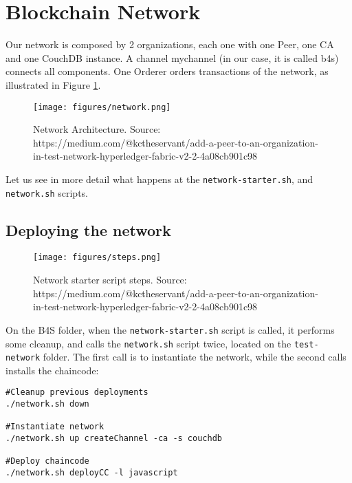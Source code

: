 \documentclass[12pt,a4paper]{article}
\theoremstyle{definition}
\begin{document}


\section{Blockchain Network}

Our network is composed by 2 organizations, each one with one Peer, one CA and one CouchDB instance. A channel mychannel (in our case, it is called b4s) connects all components. One Orderer orders transactions of the network, as illustrated in Figure \ref{fig:architecture}.


\begin{figure}[h]
    \centering
    \texttt{[image: figures/network.png]}
    \caption{Network Architecture. Source: https://medium.com/@kctheservant/add-a-peer-to-an-organization-in-test-network-hyperledger-fabric-v2-2-4a08cb901c98}
    \label{fig:architecture}
\end{figure}

Let us see in more detail what happens at the \texttt{network-starter.sh}, and \texttt{network.sh} scripts.

\subsection{Deploying the network}

\begin{figure}[h]
    \centering
    \texttt{[image: figures/steps.png]}
    \caption{Network starter script steps. Source: https://medium.com/@kctheservant/add-a-peer-to-an-organization-in-test-network-hyperledger-fabric-v2-2-4a08cb901c98}
    \label{fig:steps}
\end{figure}

On the B4S folder, when the \texttt{network-starter.sh} script is called, it performs some cleanup, and calls the \texttt{network.sh} script twice, located on the \texttt{test-network} folder. The first call is to instantiate the network, while the second calls installs the chaincode:

\begin{verbatim}
#Cleanup previous deployments
./network.sh down

#Instantiate network
./network.sh up createChannel -ca -s couchdb

#Deploy chaincode
./network.sh deployCC -l javascript
\end{verbatim}
\end{document}
